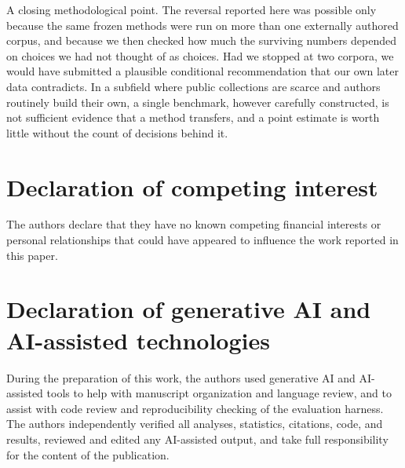 \documentclass[a4paper,fleqn]{cas-sc}
\begin{document}
A closing methodological point. The reversal reported here was possible only because the same frozen methods were run on more than one externally authored corpus, and because we then checked how much the surviving numbers depended on choices we had not thought of as choices. Had we stopped at two corpora, we would have submitted a plausible conditional recommendation that our own later data contradicts. In a subfield where public collections are scarce and authors routinely build their own, a single benchmark, however carefully constructed, is not sufficient evidence that a method transfers, and a point estimate is worth little without the count of decisions behind it.



\printcredits

\section*{Declaration of competing interest}
The authors declare that they have no known competing financial interests or personal relationships that could have appeared to influence the work reported in this paper.

\section*{Declaration of generative AI and AI-assisted technologies}
During the preparation of this work, the authors used generative AI and AI-assisted tools to help with manuscript organization and language review, and to assist with code review and reproducibility checking of the evaluation harness. The authors independently verified all analyses, statistics, citations, code, and results, reviewed and edited any AI-assisted output, and take full responsibility for the content of the publication.
\end{document}
